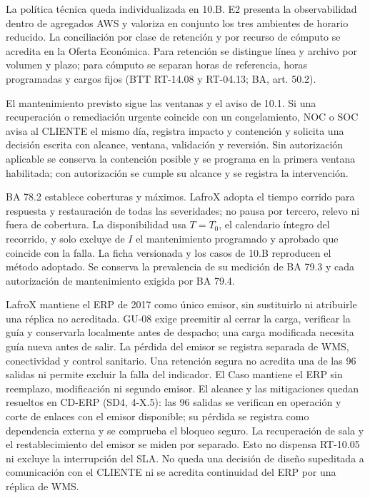 \begin{description}[style=nextline,leftmargin=0pt,labelwidth=0pt,labelsep=0pt,font=\normalfont\intersemibold]
\item[B-04. Retención de métricas y trazas.]
La política técnica queda individualizada en 10.B. E2 presenta la observabilidad dentro de agregados AWS y valoriza en conjunto los tres ambientes de horario reducido. La conciliación por clase de retención y por recurso de cómputo se acredita en la Oferta Económica. Para retención se distingue línea y archivo por volumen y plazo; para cómputo se separan horas de referencia, horas programadas y cargos fijos (BTT RT-14.08 y RT-04.13; BA, art. 50.2).

\item[B-05. Cambios de emergencia y congelamientos.]
El mantenimiento previsto sigue las ventanas y el aviso de 10.1. Si una recuperación o remediación urgente coincide con un congelamiento, NOC o SOC avisa al CLIENTE el mismo día, registra impacto y contención y solicita una decisión escrita con alcance, ventana, validación y reversión. Sin autorización aplicable se conserva la contención posible y se programa en la primera ventana habilitada; con autorización se cumple su alcance y se registra la intervención.

\item[B-06. Definiciones de medición.]
BA 78.2 establece coberturas y máximos. LafroX adopta el tiempo corrido para respuesta y restauración de todas las severidades; no pausa por tercero, relevo ni fuera de cobertura. La disponibilidad usa $T=T_0$, el calendario íntegro del recorrido, y solo excluye de $I$ el mantenimiento programado y aprobado que coincide con la falla. La ficha versionada y los casos de 10.B reproducen el método adoptado. Se conserva la prevalencia de su medición de BA 79.3 y cada autorización de mantenimiento exigida por BA 79.4.

\item[B-07. ERP y guía crítica.]
LafroX mantiene el ERP de 2017 como único emisor, sin sustituirlo ni atribuirle una réplica no acreditada. GU-08 exige preemitir al cerrar la carga, verificar la guía y conservarla localmente antes de despacho; una carga modificada necesita guía nueva antes de salir. La pérdida del emisor se registra separada de WMS, conectividad y control sanitario. Una retención segura no acredita una de las 96 salidas ni permite excluir la falla del indicador. El Caso mantiene el ERP sin reemplazo, modificación ni segundo emisor. El alcance y las mitigaciones quedan resueltos en CD-ERP (SD4, 4-X.5): las 96 salidas se verifican en operación y corte de enlaces con el emisor disponible; su pérdida se registra como dependencia externa y se comprueba el bloqueo seguro. La recuperación de sala y el restablecimiento del emisor se miden por separado. Esto no dispensa RT-10.05 ni excluye la interrupción del SLA. No queda una decisión de diseño supeditada a comunicación con el CLIENTE ni se acredita continuidad del ERP por una réplica de WMS.


\end{description}
